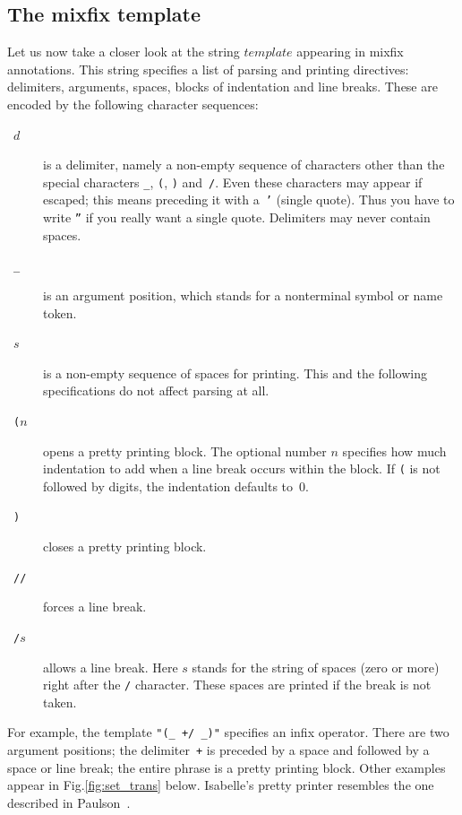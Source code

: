 \subsection{The mixfix template}
Let us now take a closer look at the string $template$ appearing in mixfix
annotations.  This string specifies a list of parsing and printing
directives: delimiters, arguments, spaces, blocks of
indentation and line breaks.  These are encoded by the following character
sequences:
\begin{description}
\item[~$d$~] is a delimiter, namely a non-empty sequence of characters
  other than the special characters {\tt _}, {\tt(}, {\tt)} and~{\tt/}.
  Even these characters may appear if escaped; this means preceding it with
  a~{\tt '} (single quote).  Thus you have to write {\tt ''} if you really
  want a single quote.  Delimiters may never contain spaces.

\item[~{\tt_}~] is an argument position, which stands for a nonterminal symbol
  or name token.

\item[~$s$~] is a non-empty sequence of spaces for printing.  This and the
  following specifications do not affect parsing at all.

\item[~{\tt(}$n$~] opens a pretty printing block.  The optional number $n$
  specifies how much indentation to add when a line break occurs within the
  block.  If {\tt(} is not followed by digits, the indentation defaults
  to~0.

\item[~{\tt)}~] closes a pretty printing block.

\item[~{\tt//}~] forces a line break.

\item[~{\tt/}$s$~] allows a line break.  Here $s$ stands for the string of
  spaces (zero or more) right after the {\tt /} character.  These spaces
  are printed if the break is not taken.
\end{description}
For example, the template {\tt"(_ +/ _)"} specifies an infix operator.
There are two argument positions; the delimiter~{\tt+} is preceded by a
space and followed by a space or line break; the entire phrase is a pretty
printing block.  Other examples appear in Fig.\ts\ref{fig:set_trans} below.
Isabelle's pretty printer resembles the one described in
Paulson~\cite{paulson91}.

